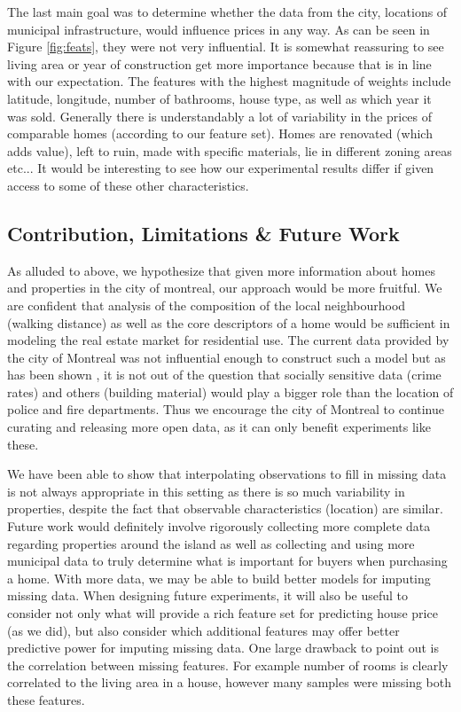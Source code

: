 \documentclass{acm_proc_article-sp}
\begin{document}
	The last main goal was to determine whether the data from the city, locations of municipal infrastructure, would influence prices in any way. As can be seen in Figure \ref{fig:feats}, they were not very influential. It is somewhat reassuring to see living area or year of construction get more importance because that is in line with our expectation. The features with the highest magnitude of weights include latitude, longitude, number of bathrooms, house type, as well as which year it was sold. Generally there is understandably a lot of variability in the prices of comparable homes (according to our feature set). Homes are renovated (which adds value), left to ruin, made with specific materials, lie in different zoning areas etc... It would be interesting to see how our experimental results differ if given access to some of these other characteristics. 
	
\subsection{Contribution, Limitations \& Future Work}
	As alluded to above, we hypothesize that given more information about homes and properties in the city of montreal, our approach would be more fruitful. We are confident that analysis of the composition of the local neighbourhood (walking distance) as well as the core descriptors of a home would be sufficient in modeling the real estate market for residential use. The current data provided by the city of Montreal was not influential enough to construct such a model but as has been shown \cite{bostonres}, it is not out of the question that socially sensitive data (crime rates) and others (building material) would play a bigger role than the location of police and fire departments. Thus we encourage the city of Montreal to continue curating and releasing more open data, as it can only benefit experiments like these.
	
	We have been able to show that interpolating observations to fill in missing data is not always appropriate in this setting as there is so much variability in properties, despite the fact that observable characteristics (location) are similar. Future work would definitely involve rigorously collecting more complete data regarding properties around the island as well as collecting and using more municipal data to truly determine what is important for buyers when purchasing a home. With more data, we may be able to build better models for imputing missing data. When designing future experiments, it will also be useful to consider not only what will provide a rich feature set for predicting house price (as we did), but also consider which additional features may offer better predictive power for imputing missing data. One large drawback to point out is the correlation between missing features. For example number of rooms is clearly correlated to the living area in a house, however many samples were missing both these features.
	
\end{document}
